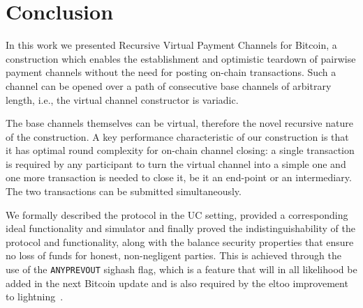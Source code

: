\section{Conclusion}

  In this work we presented Recursive Virtual Payment Channels for Bitcoin, a
  construction which enables the establishment and optimistic teardown of
  pairwise payment channels without the need for posting on-chain transactions.
  Such a channel can be opened over a path of consecutive base channels of
  arbitrary length, i.e., the virtual channel constructor is variadic.

  The base channels themselves can be virtual, therefore the novel recursive
  nature of the construction. A key performance characteristic of our
  construction is that it has optimal round complexity for on-chain channel
  closing: a single transaction is required by any participant to turn the
  virtual channel into a simple one and one more transaction is needed to close
  it, be it an end-point or an intermediary. The two transactions can be
  submitted simultaneously.

  We formally described the protocol in the UC setting, provided a corresponding
  ideal functionality and simulator and finally proved the indistinguishability
  of the protocol and functionality, along with the balance security properties
  that ensure no loss of funds for honest, non-negligent parties. This is
  achieved through the use of the \texttt{ANYPREVOUT} sighash flag, which is a
  feature that will in all likelihood be added in the next Bitcoin update and is
  also required by the eltoo improvement to lightning~\cite{eltoo}.
